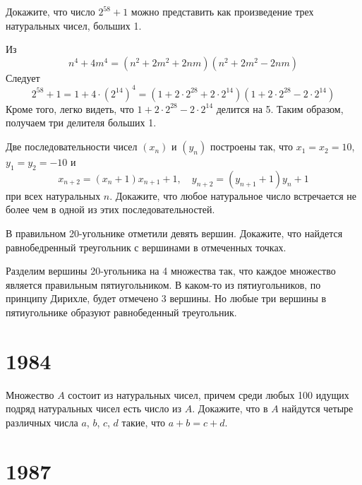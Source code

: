 \documentclass[11pt, a4paper]{common/document_template}
\begin{document}
\begin{exercise}[17]
Докажите, что число $2^{58} + 1$ можно представить как произведение трех натуральных чисел, больших 1.
\end{exercise}

\begin{Solution}
Из
$$
n^{4} + 4m^{4} = (n^{2} + 2m^{2} + 2nm)(n^{2} + 2m^{2} - 2nm)
$$
Следует
$$
2^{58} + 1 = 1 + 4 \cdot (2^{14})^{4} = (1 + 2 \cdot 2^{28} + 2 \cdot 2^{14})(1 + 2 \cdot 2^{28} - 2 \cdot 2^{14})
$$
Кроме того, легко видеть, что $1 + 2 \cdot 2^{28} - 2 \cdot 2^{14}$ делится на 5. Таким образом, получаем три делителя больших 1. 
\end{Solution}

\begin{exercise}[31]
Две последовательности чисел $(x_{n})$ и $(y_{n})$ построены так, что $x_{1} = x_{2} = 10$, $y_{1} = y_{2} = -10$ и
$$
x_{n+2}=(x_{n}+1)x_{n+1}+1, \quad y_{n+2}=(y_{n+1} + 1)y_{n}+1
$$
при всех натуральных $n$. Докажите, что любое натуральное число встречается не более чем в одной из этих последовательностей.
\end{exercise}

\begin{exercise}[37]
В правильном 20-угольнике отметили девять вершин. Докажите, что найдется равнобедренный треугольник с вершинами в отмеченных точках.
\end{exercise}

\begin{Solution}
Разделим вершины 20-угольника на 4 множества так, что каждое множество является правильным пятиугольником. В каком-то из пятиугольников, по принципу Дирихле, будет отмечено 3 вершины. Но любые три вершины в пятиугольнике образуют равнобеденный треугольник.
\end{Solution}

\chapter{1984}

\begin{exercise}
Множество $A$ состоит из натуральных чисел, причем среди любых 100 идущих подряд натуральных чисел есть число из $A$. Докажите, что в $A$ найдутся четыре различных числа $a$, $b$, $c$, $d$ такие, что $a + b = c + d$.
\end{exercise}

\chapter{1987}
\end{document}
